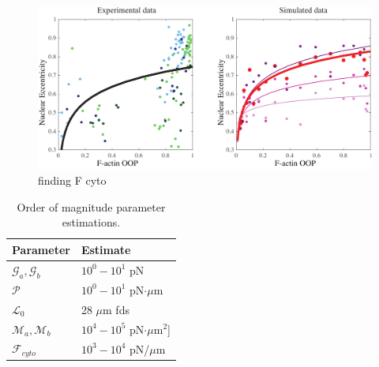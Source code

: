 \begin{figure}[h]
\centering
\captionsetup{width=.9\linewidth}
\includegraphics[width=7in]{Project3/figs/EccentricityvsOOP.pdf}
\caption{finding F cyto}
\label{fig::eccopp}
\end{figure}

\begin{table}[t!]
\caption{Order of magnitude parameter estimations.}\centering \label{tab:OoMest} 
\begin{tabular}{ l  l}
\hline
Parameter  & Estimate \\
\hline
$\mathcal{G}_a, \mathcal{G}_b$ & $10^0 - 10^1$ pN \\
$\mathcal{P}$ & $10^0 - 10^1$ pN$\cdot \mu$m \\
$\mathcal{L}_0$ &  28 $\mu$m  fds\\
$\mathcal{M}_a, \mathcal{M}_b $ & $10^4 - 10^5$ pN$\cdot \mu$m$^2$] \\
$\mathcal{F}_{cyto}$ &$10^3 - 10^4$ pN/$\mu$m \\
\hline
\end{tabular}
\end{table}

